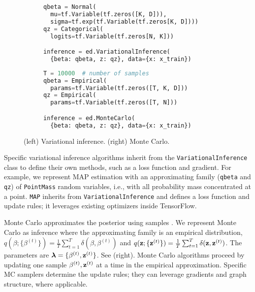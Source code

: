 \begin{figure}[!h]
\begin{subfigure}{0.5\columnwidth}
  \centering
\begin{lstlisting}[language=Python]
qbeta = Normal(
  mu=tf.Variable(tf.zeros([K, D])),
  sigma=tf.exp(tf.Variable(tf.zeros[K, D])))
qz = Categorical(
  logits=tf.Variable(tf.zeros[N, K]))

inference = ed.VariationalInference(
  {beta: qbeta, z: qz}, data={x: x_train})
\end{lstlisting}
\end{subfigure}%
\begin{subfigure}{0.5\columnwidth}
  \centering
\begin{lstlisting}[language=Python]
T = 10000  # number of samples
qbeta = Empirical(
  params=tf.Variable(tf.zeros([T, K, D]))
qz = Empirical(
  params=tf.Variable(tf.zeros([T, N]))

inference = ed.MonteCarlo(
  {beta: qbeta, z: qz}, data={x: x_train})
\end{lstlisting}
\end{subfigure}
\caption{(left) Variational inference. (right) Monte Carlo.}
\label{fig:inference}
\end{figure}

Specific variational inference algorithms inherit from
the \texttt{VariationalInference} class to define their own methods, such as a
loss function and gradient. For example, we represent \gls{MAP} estimation with
an approximating family (\texttt{qbeta} and \texttt{qz}) of
\texttt{PointMass} random variables,
i.e., with all probability mass concentrated at a point. \texttt{MAP}
inherits from \texttt{VariationalInference} and defines a loss
function and update rules; it leverages existing optimizers inside TensorFlow.

Monte Carlo approximates the posterior using samples
\citep{robert1999monte}. We represent Monte Carlo as inference where
the approximating family is an empirical distribution,
$q(\beta; \{\beta^{(t)}\}) = \frac{1}{T}\sum_{t=1}^T \delta(\beta,
\beta^{(t)})$
and
$q(\boldsymbol{\mathbf{z}}; \{\boldsymbol{\mathbf{z}}^{(t)}\}) = \frac{1}{T}\sum_{t=1}^T \delta(\boldsymbol{\mathbf{z}},
\boldsymbol{\mathbf{z}}^{(t)})$. The parameters are $\boldsymbol{\mathbf{\lambda}}=\{\beta^{(t)},\boldsymbol{\mathbf{z}}^{(t)}\}$.
See  (right).
Monte Carlo
algorithms proceed by updating one sample $\beta^{(t)},\boldsymbol{\mathbf{z}}^{(t)}$ at a time in the empirical
approximation.
Specific \gls{MC} samplers determine the update rules;
they can leverage gradients and graph structure, where applicable.

